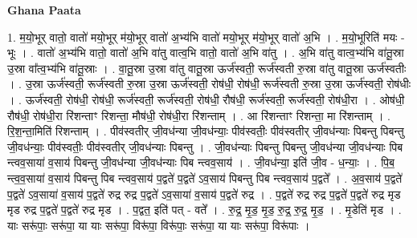 \documentclass[17pt]{extarticle}
\begin{document}
\textbf{Ghana Paata } \newline

1. म॒यो॒भूर् वातो॒ वातो॑ मयो॒भूर् म॑यो॒भूर् वातो॑ अ॒भ्य॑भि वातो॑ मयो॒भूर् म॑यो॒भूर् वातो॑ अ॒भि । . म॒यो॒भूरिति॑ मयः - भूः । . वातो॑ अ॒भ्य॑भि वातो॒ वातो॑ अ॒भि वा॑तु वात्व॒भि वातो॒ वातो॑ अ॒भि वा॑तु । . अ॒भि वा॑तु वात्व॒भ्य॑भि वा॑तू॒स्रा उ॒स्रा वा᳚त्व॒भ्य॑भि वा॑तू॒स्राः । . वा॒तू॒स्रा उ॒स्रा वा॑तु वातू॒स्रा ऊर्ज॑स्वती॒ रूर्ज॑स्वती रु॒स्रा वा॑तु वातू॒स्रा ऊर्ज॑स्वतीः । . उ॒स्रा ऊर्ज॑स्वती॒ रूर्ज॑स्वती रु॒स्रा उ॒स्रा ऊर्ज॑स्वती॒ रोष॑धी॒ रोष॑धी॒ रूर्ज॑स्वती रु॒स्रा उ॒स्रा ऊर्ज॑स्वती॒ रोष॑धीः । . ऊर्ज॑स्वती॒ रोष॑धी॒ रोष॑धी॒ रूर्ज॑स्वती॒ रूर्ज॑स्वती॒ रोष॑धी॒ रौष॑धी॒ रूर्ज॑स्वती॒ रूर्ज॑स्वती॒ रोष॑धी॒रा । . ओष॑धी॒ रौष॑धी॒ रोष॑धी॒रा रि॑शन्ताꣳ रिशन्ता॒ मौष॑धी॒ रोष॑धी॒रा रि॑शन्ताम् । . आ रि॑शन्ताꣳ रिशन्ता॒ मा रि॑शन्ताम् । . रि॒श॒न्ता॒मिति॑ रिशन्ताम् । . पीव॑स्वतीर् जी॒वध॑न्या जी॒वध॑न्याः॒ पीव॑स्वतीः॒ पीव॑स्वतीर् जी॒वध॑न्याः पिबन्तु पिबन्तु जी॒वध॑न्याः॒ पीव॑स्वतीः॒ पीव॑स्वतीर् जी॒वध॑न्याः पिबन्तु । . जी॒वध॑न्याः पिबन्तु पिबन्तु जी॒वध॑न्या जी॒वध॑न्याः पिब न्त्वव॒साया॑ व॒साय॑ पिबन्तु जी॒वध॑न्या जी॒वध॑न्याः पिब न्त्वव॒साय॑ । . जी॒वध॑न्या॒ इति॑ जी॒व - ध॒न्याः॒ । . पि॒ब॒ न्त्व॒व॒साया॑ व॒साय॑ पिबन्तु पिब न्त्वव॒साय॑ प॒द्वते॑ प॒द्वते॑ ऽव॒साय॑ पिबन्तु पिब न्त्वव॒साय॑ प॒द्वते᳚ । . अ॒व॒साय॑ प॒द्वते॑ प॒द्वते॑ ऽव॒साया॑ व॒साय॑ प॒द्वते॑ रुद्र रुद्र प॒द्वते॑ ऽव॒साया॑ व॒साय॑ प॒द्वते॑ रुद्र । . प॒द्वते॑ रुद्र रुद्र प॒द्वते॑ प॒द्वते॑ रुद्र मृड मृड रुद्र प॒द्वते॑ प॒द्वते॑ रुद्र मृड । . प॒द्वत॒ इति॑ पत् - वते᳚ । . रु॒द्र॒ मृ॒ड॒ मृ॒ड॒ रु॒द्र॒ रु॒द्र॒ मृ॒ड॒ । . मृ॒डेति॑ मृड । . याः सरू॑पाः॒ सरू॑पा॒ या याः सरू॑पा॒ विरू॑पा॒ विरू॑पाः॒ सरू॑पा॒ या याः सरू॑पा॒ विरू॑पाः । \newline
\end{document}
